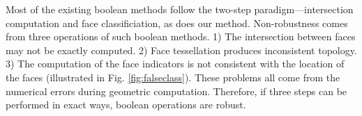 

Most of the existing boolean methods follow the two-step paradigm---intersection computation and face classificiation, as does our method. Non-robustness comes from three operations of such boolean methods. 1) The intersection between faces may not be exactly computed. 2) Face tessellation produces inconsistent topology. 3) The computation of the face indicators is not consistent with the location of the faces (illustrated in Fig. \ref{fig:falseclass}). These problems all come from the numerical errors during geometric computation. Therefore, if three steps can be performed in exact ways, boolean operations are robust.
%



